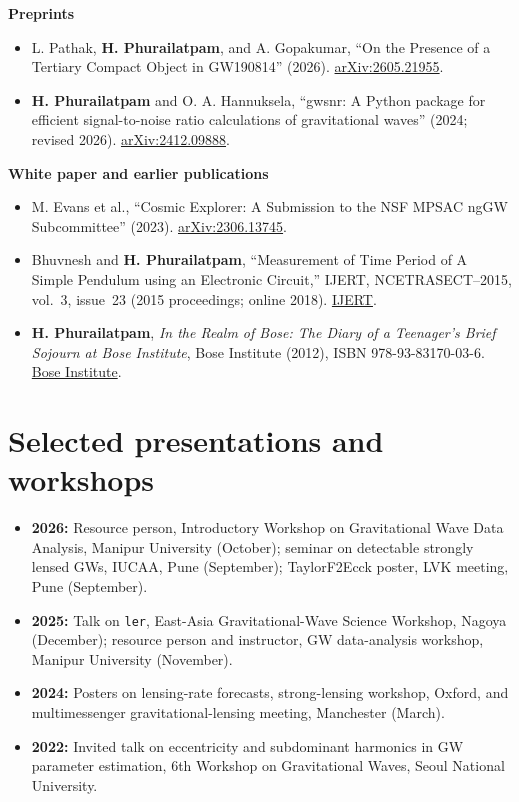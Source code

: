 \documentclass[11pt,a4paper]{article}
\begin{document}
\textbf{Preprints}
\begin{itemize}
\item L. Pathak, \textbf{H. Phurailatpam}, and A. Gopakumar, ``On the Presence of a Tertiary Compact Object in GW190814'' (2026). \href{https://arxiv.org/abs/2605.21955}{arXiv:2605.21955}.
\item \textbf{H. Phurailatpam} and O. A. Hannuksela, ``gwsnr: A Python package for efficient signal-to-noise ratio calculations of gravitational waves'' (2024; revised 2026). \href{https://arxiv.org/abs/2412.09888}{arXiv:2412.09888}.
\end{itemize}

\textbf{White paper and earlier publications}
\begin{itemize}
\item M. Evans et al., ``Cosmic Explorer: A Submission to the NSF MPSAC ngGW Subcommittee'' (2023). \href{https://arxiv.org/abs/2306.13745}{arXiv:2306.13745}.
\item Bhuvnesh and \textbf{H. Phurailatpam}, ``Measurement of Time Period of A Simple Pendulum using an Electronic Circuit,'' IJERT, NCETRASECT--2015, vol.~3, issue~23 (2015 proceedings; online 2018). \href{https://www.ijert.org/measurement-of-time-period-of-a-simple-pendulum-using-an-electronic-circuit}{IJERT}.
\item \textbf{H. Phurailatpam}, \emph{In the Realm of Bose: The Diary of a Teenager's Brief Sojourn at Bose Institute}, Bose Institute (2012), ISBN 978-93-83170-03-6. \href{https://jcbose.ac.in/publication}{Bose Institute}.
\end{itemize}

\section*{Selected presentations and workshops}
\begin{itemize}
\item \textbf{2026:} Resource person, Introductory Workshop on Gravitational Wave Data Analysis, Manipur University (October); seminar on detectable strongly lensed GWs, IUCAA, Pune (September); TaylorF2Ecck poster, LVK meeting, Pune (September).
\item \textbf{2025:} Talk on \texttt{ler}, East-Asia Gravitational-Wave Science Workshop, Nagoya (December); resource person and instructor, GW data-analysis workshop, Manipur University (November).
\item \textbf{2024:} Posters on lensing-rate forecasts, strong-lensing workshop, Oxford, and multimessenger gravitational-lensing meeting, Manchester (March).
\item \textbf{2022:} Invited talk on eccentricity and subdominant harmonics in GW parameter estimation, 6th Workshop on Gravitational Waves, Seoul National University.
\end{itemize}
\end{document}
